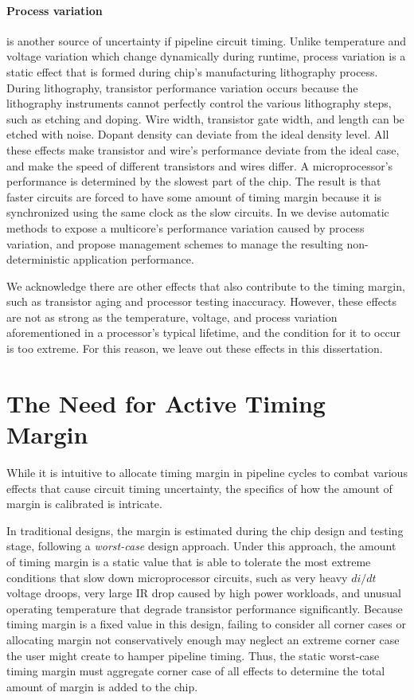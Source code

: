 \paragraph{Process variation} is another source of uncertainty if pipeline circuit timing. Unlike temperature and voltage variation which change dynamically during runtime, process variation is a static effect that is formed during chip's manufacturing lithography process. During lithography, transistor performance variation occurs because the lithography instruments cannot perfectly control the various lithography steps, such as etching and doping. Wire width, transistor gate width, and length can be etched with noise. Dopant density can deviate from the ideal density level. All these effects make transistor and wire's performance deviate from the ideal case, and make the speed of different transistors and wires differ. A microprocessor's performance is determined by the slowest part of the chip. The result is that faster circuits are forced to have some amount of timing margin because it is synchronized using the same clock as the slow circuits. In  we devise automatic methods to expose a multicore's performance variation caused by process variation, and propose management schemes to manage the resulting non-deterministic application performance.

We acknowledge there are other effects that also contribute to the timing margin, such as transistor aging and processor testing inaccuracy. However, these effects are not as strong as the temperature, voltage, and process variation aforementioned in a processor's typical lifetime, and the condition for it to occur is too extreme. For this reason, we leave out these effects in this dissertation.

\section{The Need for Active Timing Margin}
\label{sec:background:motivation}

While it is intuitive to allocate timing margin in pipeline cycles to combat various effects that cause circuit timing uncertainty, the specifics of how the amount of margin is calibrated is intricate. 

In traditional designs, the margin is estimated during the chip design and testing stage, following a \textit{worst-case} design approach. Under this approach, the amount of timing margin is a static value that is able to tolerate the most extreme conditions that slow down microprocessor circuits, such as very heavy $di/dt$ voltage droops, very large IR drop caused by high power workloads, and unusual operating temperature that degrade transistor performance significantly. Because timing margin is a fixed value in this design, failing to consider all corner cases or allocating margin not conservatively enough may neglect an extreme corner case the user might create to hamper pipeline timing. Thus, the static worst-case timing margin must aggregate corner case of all effects to determine the total amount of margin is added to the chip.


